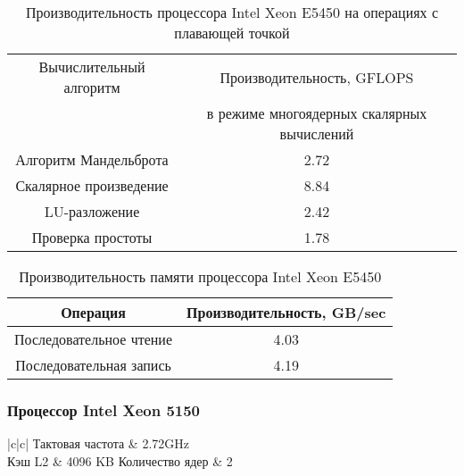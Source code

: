 \begin{table}[ht]
	\begin{center}
		\caption{Производительность процессора Intel Xeon  E5450 на операциях с плавающей точкой}
		\begin{tabular}{|c|c|}
			\hline	
			Вычислительный алгоритм &  Производительность, GFLOPS \\ 
			& в режиме многоядерных скалярных вычислений \\ \hline
			Алгоритм Мандельброта  &  2.72 	\\ \hline
			Скалярное произведение &  8.84   \\ \hline
			LU-разложение          &  2.42   \\ \hline
			Проверка простоты      & 1.78  \\ \hline 
			
			
		\end{tabular}
	\end{center} 	
\end{table} 	

\begin{table}[ht]
	\begin{center}
		\caption{Производительность памяти процессора Intel Xeon  E5450}
		\begin{tabular}{|c|c|}
			\hline	
			Операция  &  Производительность, GB/sec \\ \hline
			Последовательное чтение &  4.03 	\\  \hline
			Последовательная запись &  4.19   \\  \hline
		
		\end{tabular}
	\end{center} 	
\end{table} 	


\subsubsection{Процессор Intel Xeon  5150}
\label{app_5150}


\begin{table}[ht]
	\begin{center}
		\caption{Основные характеристики процессора Intel Xeon  5150}
		\begin{tabular}{|c|c|}
			\hline	
			Тактовая частота & 2.72GHz   \\ \hline
			Кэш L2          & 4096 KB
			Количество ядер & 2 	     \\ \hline
		\end{tabular}
	\end{center} 	
\end{table} 	

